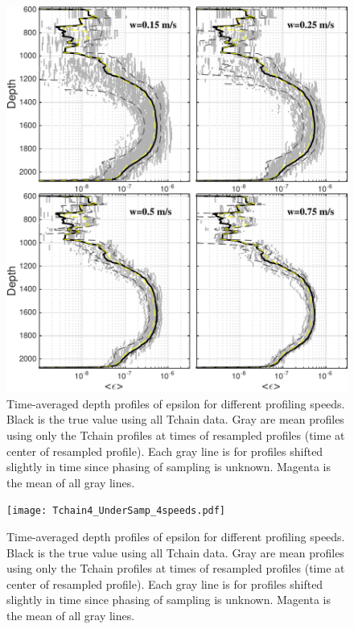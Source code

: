 \documentclass[11pt]{article}
\begin{document}
\begin{figure}[htbp]
\includegraphics[scale=0.8]{Tchain3_UnderSamp_4speeds.pdf}
\caption{Time-averaged depth profiles of epsilon for different profiling speeds. Black is the true value using all Tchain data. Gray are mean profiles using only the Tchain profiles at times of resampled profiles (time at center of resampled profile). Each gray line is for profiles shifted slightly in time since phasing of sampling is unknown. Magenta is the mean of all gray lines.}
\label{}
\end{figure}

\begin{figure}[htbp]
\texttt{[image: Tchain4\_UnderSamp\_4speeds.pdf]}
\caption{Time-averaged depth profiles of epsilon for different profiling speeds. Black is the true value using all Tchain data. Gray are mean profiles using only the Tchain profiles at times of resampled profiles (time at center of resampled profile). Each gray line is for profiles shifted slightly in time since phasing of sampling is unknown. Magenta is the mean of all gray lines.}
\label{}
\end{figure}
\end{document}
